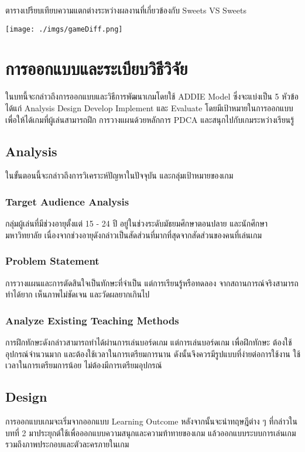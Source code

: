 \documentclass[12pt,oneside,openright,a4paper]{cpe-thai-project}
\begin{document}
\begin{table}[H]
  \caption{ตารางเปรียบเทียบความแตกต่างระหว่างผลงานที่เกี่ยวข้องกับ Sweets VS Sweets}\label{tbl:gameDiff}
  \texttt{[image: ./imgs/gameDiff.png]}
\end{table}


\chapter{การออกแบบและระเบียบวิธีวิจัย}

ในบทนี้จะกล่าวถึงการออกแบบและวิธีการพัฒนาเกมโดยใช้ ADDIE Model 
ซึ่งจะแบ่งเป็น 5 หัวข้อ ได้แก่ Analysis Design Develop Implement 
และ Evaluate โดยมีเป้าหมายในการออกแบบเพื่อให้ได้เกมที่ผู้เล่นสามารถฝึก
การวางแผนด้วยหลักการ PDCA และสนุกไปกับเกมระหว่างเรียนรู้


\section{Analysis}
ในขั้นตอนนี้จะกล่าวถึงการวิเคราะห์ปัญหาในปัจจุบัน และกลุ่มเป้าหมายของเกม

\subsection{Target Audience Analysis}
กลุ่มผู้เล่นที่มีช่วงอายุตั้งแต่ 15 - 24 ปี อยู่ในช่วงระดับมัธยมศึกษาตอนปลาย
และนักศึกษามหาวิทยาลัย เนื่องจากช่วงอายุดังกล่าวเป็นสัดส่วนที่มากที่สุดจากสัดส่วนของคนที่เล่นเกม 

\subsection{Problem Statement}
การวางแผนและการตัดสินใจเป็นทักษะที่จำเป็น แต่การเรียนรู้หรือทดลอง
จากสถานการณ์จริงสามารถทำได้ยาก เห็นภาพไม่ชัดเจน และวัดผลยากเกินไป

\subsection{Analyze Existing Teaching Methods}
การฝึกทักษะดังกล่าวสามารถทำได้ผ่านการเล่นบอร์ดเกม แต่การเล่นบอร์ดเกม
เพื่อฝึกทักษะ ต้องใช้อุปกรณ์จำนวนมาก และต้องใช้เวลาในการเตรียมการนาน 
ดังนั้นจึงควรมีรูปแบบที่ง่ายต่อการใช้งาน ใช้เวลาในการเตรียมการน้อย 
ไม่ต้องมีการเตรียมอุปกรณ์


\section{Design}
การออกแบบเกมจะเริ่มจากออกแบบ Learning Outcome หลังจากนั้นจะนำทฤษฎีต่าง ๆ 
ที่กล่าวในบทที่ 2 มาประยุกต์ใช้เพื่อออกแบบความสนุกและความท้าทายของเกม 
แล้วออกแบบระบบการเล่นเกมรวมถึงภาพประกอบและตัวละครภายในเกม
\end{document}
